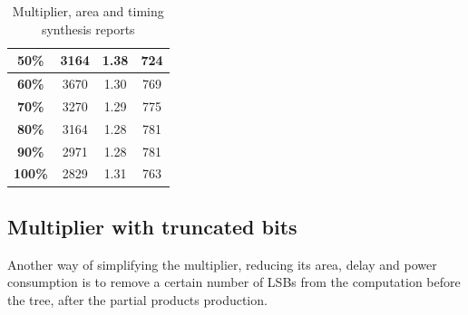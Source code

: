 \documentclass[a4paper]{article}
\begin{document}
\begin{table}[hbtp]
\begin{tabular}{|c|c|c|c|}
		\textbf{50\%}                                                                   & 		3164                                                                       & 		1.38                                                                       & 		724                                                                                  \\ \hline
		\textbf{60\%}                                                                   & 		3670                                                                       & 		1.30                                                                       & 		769                                                                                  \\ \hline
		\textbf{70\%}                                                                   & 		3270                                                                       & 		1.29                                                                       & 		775                                                                                  \\ \hline
		\textbf{80\%}                                                                   & 		3164                                                                       & 		1.28                                                                       & 		781                                                                                  \\ \hline
		\textbf{90\%}                                                                   & 		2971                                                                       & 		1.28                                                                       & 		781                                                                                  \\ \hline
		\textbf{100\%}                                                                  & 		2829                                                                       & 		1.31                                                                       & 		763                                                                                  \\ \hline
		\end{tabular}
		\caption{Multiplier, area and timing synthesis reports}
		\label{tab:mult_syn}
	\end{table}

	\subsection{Multiplier with truncated bits}
	Another way of simplifying the multiplier, reducing its area, delay and power consumption is to remove a certain number of LSBs from the computation before the tree, after the partial products production. 
\end{document}
